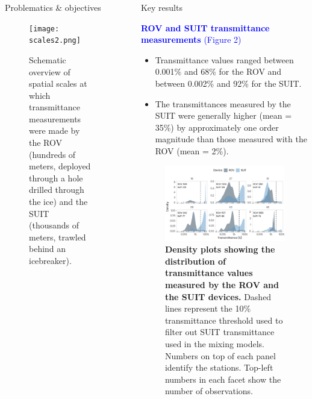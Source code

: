 \documentclass[final]{beamer}
\newlength{\sepwidth}
\newlength{\colwidth}
\newcommand{\separatorcolumn}{\begin{column}{\sepwidth}\end{column}}
\begin{document}
\begin{frame}[t]
\begin{columns}[t]
\begin{column}{\colwidth}
\begin{block}{Problematics \& objectives}
				\begin{figure}
					\centering
					\texttt{[image: scales2.png]}
					\caption{Schematic overview of spatial scales at which transmittance measurements were made by the ROV (hundreds of meters, deployed through a hole drilled through the ice) and the SUIT (thousands of meters, trawled behind an icebreaker).}
				\end{figure}

			\end{block}

		\end{column}

		\separatorcolumn

		\begin{column}{\colwidth}

			\begin{block}{Key results}

				\textcolor{blue}{\large \textbf{ROV and SUIT transmittance measurements} (Figure 2)}

				\begin{itemize}
					\justifying
					\setlength\itemsep{1em}
					\item Transmittance values ranged between 0.001\% and 68\% for the ROV and between 0.002\% and 92\% for the SUIT.
					\item The transmittances measured by the SUIT were generally higher (mean = 35\%) by approximately one order magnitude than those measured with the ROV (mean = 2\%).
				\end{itemize}

				\begin{figure}
					\vspace{-25mm}
					\centering
					\includegraphics[scale = 1.75]{graphs/fig3.pdf}
					\caption{\textbf{Density plots showing the distribution of transmittance values measured by the ROV and the SUIT devices.} Dashed lines represent the 10\% transmittance threshold used to filter out SUIT transmittance used in the mixing models. Numbers on top of each panel identify the stations. Top-left numbers in each facet show the number of observations.}
				\end{figure}


\end{block}
\end{column}
\end{columns}
\end{frame}
\end{document}
